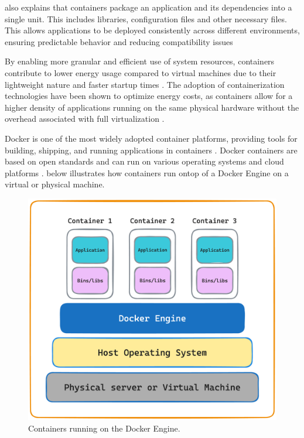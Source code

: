\documentclass[
  table]{report}
\begin{document}
\citet{merkelDockerLightweightLinux2014} also explains that containers
package an application and its dependencies into a single unit. This
includes libraries, configuration files and other necessary files. This
allows applications to be deployed consistently across different
environments, ensuring predictable behavior and reducing compatibility
issues \citep{sergeevDockerContainerPerformance2022}

By enabling more granular and efficient use of system resources,
containers contribute to lower energy usage compared to virtual machines
due to their lightweight nature and faster startup times
\citep{shirinbabPerformanceEvaluationContainers2020}. The adoption of
containerization technologies have been shown to optimize energy costs,
as containers allow for a higher density of applications running on the
same physical hardware without the overhead associated with full
virtualization
\citep{cuadrado-corderoComparativeExperimentalAnalysis2018}.

Docker is one of the most widely adopted container platforms, providing
tools for building, shipping, and running applications in containers
\citep{merkelDockerLightweightLinux2014}. Docker containers are based on
open standards and can run on various operating systems and cloud
platforms \citep{sergeevDockerContainerPerformance2022}.
 below illustrates how containers run ontop of a
Docker Engine on a virtual or physical machine.

\begin{figure}[H]
\centering
  \includegraphics[width=0.7\columnwidth]{assets/3.3-container-figure.png}
  \caption{Containers running on the Docker Engine.}
  \label{container-figure}
\end{figure}
\end{document}

